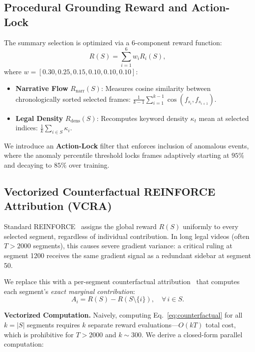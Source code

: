 \documentclass[letterpaper]{article} %
\begin{document}
\subsection{Procedural Grounding Reward and Action-Lock}
The summary selection is optimized via a 6-component reward function:
\begin{equation}
    R(S) = \sum_{i=1}^6 w_i R_i(S),
\end{equation}
where $w = [0.30, 0.25, 0.15, 0.10, 0.10, 0.10]$:
\begin{itemize}
    \item \textbf{Narrative Flow} $R_{\text{narr}}(S)$: Measures cosine similarity between chronologically sorted selected frames: $\frac{1}{k-1}\sum_{i=1}^{k-1} \cos(f_{s_i}, f_{s_{i+1}})$.
    \item \textbf{Legal Density} $R_{\text{dens}}(S)$: Recomputes keyword density $\kappa_t$ mean at selected indices: $\frac{1}{k}\sum_{i \in S} \kappa_i$.
\end{itemize}
We introduce an \textbf{Action-Lock} filter that enforces inclusion of anomalous events, where the anomaly percentile threshold locks frames adaptively starting at $95\%$ and decaying to $85\%$ over training.

\subsection{Vectorized Counterfactual REINFORCE Attribution (VCRA)}

Standard REINFORCE~\cite{williams1992simple} assigns the global reward $R(S)$ uniformly to every selected segment, regardless of individual contribution. In long legal videos (often $T > 2000$ segments), this causes severe gradient variance: a critical ruling at segment 1200 receives the same gradient signal as a redundant sidebar at segment 50.

We replace this with a per-segment counterfactual attribution~\cite{foerster2018counterfactual} that computes each segment's \emph{exact marginal contribution}:
\begin{equation}
    A_i = R(S) - R(S \setminus \{i\}), \quad \forall\, i \in S.
\label{eq:counterfactual}
\end{equation}

\textbf{Vectorized Computation.} Naively, computing Eq.~\eqref{eq:counterfactual} for all $k = |S|$ segments requires $k$ separate reward evaluations---$O(kT)$ total cost, which is prohibitive for $T > 2000$ and $k \sim 300$. We derive a closed-form parallel computation:
\end{document}
